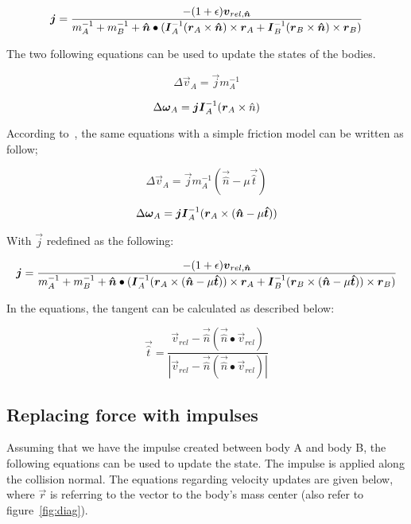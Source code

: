 \begin{equation}
  \boldsymbol{j} = \frac{-(1+\epsilon)\boldsymbol{v}_{rel,\boldsymbol{\hat{n}}}}
  {m_A^{-1}+m_B^{-1}+\boldsymbol{\hat{n}}\bullet(\boldsymbol{I}_A^{-1}(\boldsymbol{r}_A\times\boldsymbol{\hat{n}})\times\boldsymbol{r}_A
  +\boldsymbol{I}_B^{-1}(\boldsymbol{r}_B\times\boldsymbol{\hat{n}})\times\boldsymbol{r}_B)}
\end{equation}

The two following equations can be used to update the states of the bodies.

\begin{equation}
  \Delta\vec{v}_A = \vec{j}m_A^{-1}
\end{equation}

\begin{equation}
  \Delta\boldsymbol{\omega}_A = \boldsymbol{j}\boldsymbol{I}_A^{-1}(\boldsymbol{r}_A\times\hat{n})
\end{equation}

According to~\cite{hansson}, the same equations with a simple friction model can
be written as follow;

\begin{equation}
  \Delta\vec{v}_A = \vec{j}m_A^{-1}(\vec{\hat{n}} - \mu\vec{\hat{t}})
\end{equation}

\begin{equation}
  \Delta\boldsymbol{\omega}_A = \boldsymbol{j}\boldsymbol{I}_A^{-1}(\boldsymbol{r}_A\times(\boldsymbol{\hat{n}}-\mu\boldsymbol{\hat{t}}))
\end{equation}

With $\vec{j}$ redefined as the following:

\begin{equation}\label{eq:j}
  \boldsymbol{j} = \frac{-(1+\epsilon)\boldsymbol{v}_{rel,\boldsymbol{\hat{n}}}}
  {m_A^{-1}+m_B^{-1}+\boldsymbol{\hat{n}}\bullet(\boldsymbol{I}_A^{-1}(\boldsymbol{r}_A\times(\boldsymbol{\hat{n}}-\mu\boldsymbol{\hat{t}}))\times\boldsymbol{r}_A
  +\boldsymbol{I}_B^{-1}(\boldsymbol{r}_B\times(\boldsymbol{\hat{n}}-\mu\boldsymbol{\hat{t}}))\times\boldsymbol{r}_B)}
\end{equation}

In the equations, the tangent can be calculated as described below:

\begin{equation}
  \vec{\hat{t}}=\frac{\vec{v}_{rel}-\vec{\hat{n}}(\vec{\hat{n}}\bullet\vec{v}_{rel})}{|\vec{v}_{rel}-\vec{\hat{n}}(\vec{\hat{n}}\bullet\vec{v}_{rel})|}
\end{equation}

\subsection{Replacing force with impulses}
Assuming that we have the impulse created between body A and body B, the following
equations can be used to update the state. The impulse is applied along the collision normal.
The equations regarding velocity updates are given below, where $\vec{r}$
is referring to the vector to the body's mass center (also refer to figure~\ref{fig:diag}).

